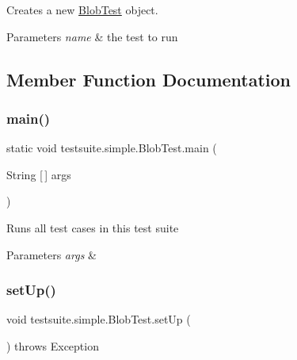 Creates a new \mbox{\hyperlink{classtestsuite_1_1simple_1_1_blob_test}{Blob\+Test}} object.


\begin{DoxyParams}{Parameters}
{\em name} & the test to run \\
\hline
\end{DoxyParams}


\subsection{Member Function Documentation}
\mbox{\label{classtestsuite_1_1simple_1_1_blob_test_afda9a3e28dbbf808702dcf118e046ec6}} 
\subsubsection{\texorpdfstring{main()}{main()}}
{\footnotesize\ttfamily static void testsuite.\+simple.\+Blob\+Test.\+main (\begin{DoxyParamCaption}\item[{String \mbox{[}$\,$\mbox{]}}]{args }\end{DoxyParamCaption})\hspace{0.3cm}{\ttfamily [static]}}

Runs all test cases in this test suite


\begin{DoxyParams}{Parameters}
{\em args} & \\
\hline
\end{DoxyParams}
\mbox{\label{classtestsuite_1_1simple_1_1_blob_test_a81577d1e5c0481dee0a1b3f5638081df}} 
\subsubsection{\texorpdfstring{set\+Up()}{setUp()}}
{\footnotesize\ttfamily void testsuite.\+simple.\+Blob\+Test.\+set\+Up (\begin{DoxyParamCaption}{ }\end{DoxyParamCaption}) throws Exception}

